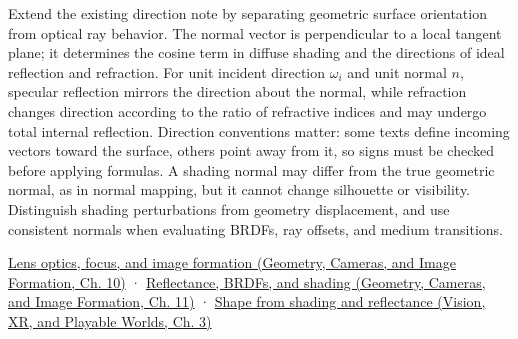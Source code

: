 \hypertarget{appendix-44e00863b4d5-university-course-development}{}

Extend the existing direction note by separating geometric surface orientation from optical ray behavior. The normal vector is perpendicular to a local tangent plane; it determines the cosine term in diffuse shading and the directions of ideal reflection and refraction. For unit incident direction \(\omega_i\) and unit normal \(n\), specular reflection mirrors the direction about the normal, while refraction changes direction according to the ratio of refractive indices and may undergo total internal reflection. Direction conventions matter: some texts define incoming vectors toward the surface, others point away from it, so signs must be checked before applying formulas. A shading normal may differ from the true geometric normal, as in normal mapping, but it cannot change silhouette or visibility. Distinguish shading perturbations from geometry displacement, and use consistent normals when evaluating BRDFs, ray offsets, and medium transitions.

\href{../03-Geometry-Cameras-and-Image-Formation/main.pdf\#nameddest=03-visual-computing-i-ch003-lens-optics-focus-and-image-formation}{Lens optics, focus, and image formation (Geometry, Cameras, and Image Formation, Ch. 10)} · \href{../03-Geometry-Cameras-and-Image-Formation/main.pdf\#nameddest=03-visual-computing-i-ch004-reflectance-brdfs-and-shading}{Reflectance, BRDFs, and shading (Geometry, Cameras, and Image Formation, Ch. 11)} · \href{../07-Vision-XR-and-Playable-Worlds/main.pdf\#nameddest=04-visual-computing-ii-ch032-shape-from-shading-and-reflectance}{Shape from shading and reflectance (Vision, XR, and Playable Worlds, Ch. 3)}
